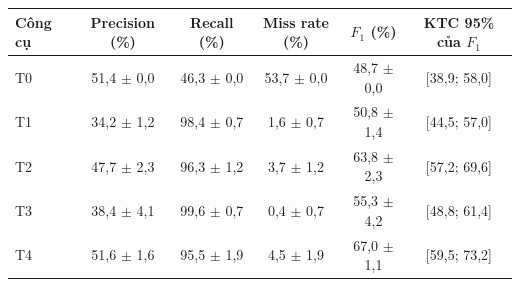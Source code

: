 \begin{tabular}{lccccc}
\toprule
\textbf{Công cụ} & \textbf{Precision (\%)} & \textbf{Recall (\%)} & \textbf{Miss rate (\%)} & \textbf{$F_1$ (\%)} & \textbf{KTC 95\% của $F_1$} \\
\midrule
T0 & 51{,}4 $\pm$ 0{,}0 & 46{,}3 $\pm$ 0{,}0 & 53{,}7 $\pm$ 0{,}0 & 48{,}7 $\pm$ 0{,}0 & [38{,}9; 58{,}0] \\
T1 & 34{,}2 $\pm$ 1{,}2 & 98{,}4 $\pm$ 0{,}7 & 1{,}6 $\pm$ 0{,}7 & 50{,}8 $\pm$ 1{,}4 & [44{,}5; 57{,}0] \\
T2 & 47{,}7 $\pm$ 2{,}3 & 96{,}3 $\pm$ 1{,}2 & 3{,}7 $\pm$ 1{,}2 & 63{,}8 $\pm$ 2{,}3 & [57{,}2; 69{,}6] \\
T3 & 38{,}4 $\pm$ 4{,}1 & 99{,}6 $\pm$ 0{,}7 & 0{,}4 $\pm$ 0{,}7 & 55{,}3 $\pm$ 4{,}2 & [48{,}8; 61{,}4] \\
T4 & 51{,}6 $\pm$ 1{,}6 & 95{,}5 $\pm$ 1{,}9 & 4{,}5 $\pm$ 1{,}9 & 67{,}0 $\pm$ 1{,}1 & [59{,}5; 73{,}2] \\
\bottomrule
\end{tabular}
